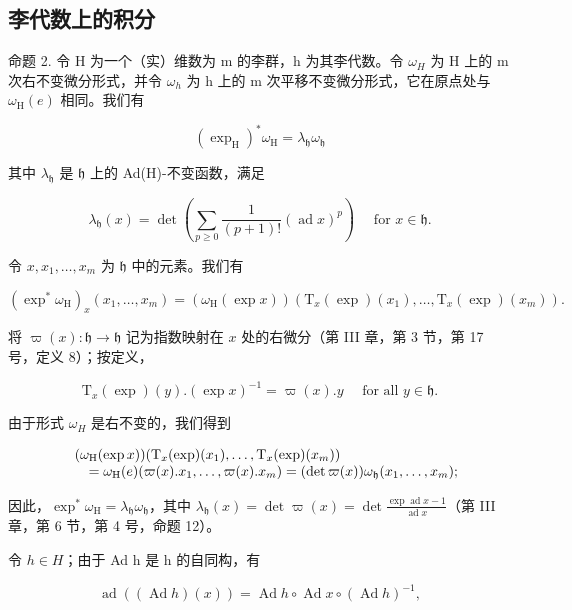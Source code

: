 \subsection{李代数上的积分}

命题 2. 令 H 为一个（实）维数为 m 的李群，h 为其李代数。令 \(\omega_{H}\) 为 H 上的 m 次右不变微分形式，并令 \(\omega_{h}\) 为 h 上的 m 次平移不变微分形式，它在原点处与 \(\omega_{\mathrm{H}}(e)\) 相同。我们有

\[
(\exp_ {\mathrm{H}}) ^ {*} \omega_ {\mathrm{H}} = \lambda_ {\mathfrak {h}} \omega_ {\mathfrak {h}}\tag{10}
\]

其中 \(\lambda_{\mathfrak{h}}\) 是 \(\mathfrak{h}\) 上的 Ad(H)-不变函数，满足

\[
\lambda_ {\mathfrak {h}} (x) = \det \left(\sum_ {p \geq 0} \frac {1}{(p + 1) !} (\operatorname{ad} x) ^ {p}\right) \quad \text { for } x \in \mathfrak {h}.
\]

令 \(x, x_1, \ldots, x_m\) 为 \(\mathfrak{h}\) 中的元素。我们有

\[
(\exp^ {*} \omega_ {\mathrm{H}}) _ {x} (x _ {1}, \dots , x _ {m}) = (\omega_ {\mathrm{H}} (\exp x)) (\mathrm{T} _ {x} (\exp) (x _ {1}), \dots , \mathrm{T} _ {x} (\exp) (x _ {m})).
\]

将 \(\varpi(x) : \mathfrak{h} \to \mathfrak{h}\) 记为指数映射在 \(x\) 处的右微分（第 III 章，第 3 节，第 17 号，定义 8）；按定义，

\[
\mathrm{T} _ {x} (\exp) (y). (\exp x) ^ {- 1} = \varpi (x). y \quad \text { for   all } y \in \mathfrak {h}.
\]

由于形式 \(\omega_{H}\) 是右不变的，我们得到

\[
\begin{array}{r l} & (\omega_ {\mathrm{H}} (\exp x)) (\mathrm{T} _ {x} (\exp) (x _ {1}), \ldots , \mathrm{T} _ {x} (\exp) (x _ {m})) \\ & \quad = \omega_ {\mathrm{H}} (e) (\varpi (x). x _ {1}, \ldots , \varpi (x). x _ {m}) = (\det \varpi (x)) \omega_ {\mathfrak {h}} (x _ {1}, \ldots , x _ {m}); \end{array}
\]

因此，\(\exp^{*}\omega_{\mathrm{H}} = \lambda_{\mathfrak{h}}\omega_{\mathfrak{h}}\)，其中 \(\lambda_{\mathfrak{h}}(x) = \det \varpi(x) = \det \frac{\exp\operatorname{ad} x - 1}{\operatorname{ad} x}\)（第 III 章，第 6 节，第 4 号，命题 12）。

令 \(h \in H\)；由于 Ad h 是 h 的自同构，有

\[
\operatorname{ad} \left((\operatorname{Ad} h) (x)\right) = \operatorname{Ad} h \circ \operatorname{Ad} x \circ (\operatorname{Ad} h) ^ {- 1},
\]

